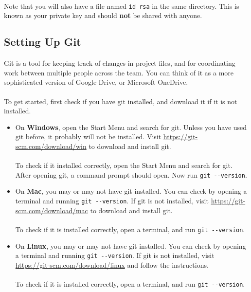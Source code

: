 \documentclass[11pt]{article}
\begin{document}
\paragraph{}
Note that you will also have a file named \lstinline{id_rsa} in the same directory. This is known as your private key and should \textbf{not} be shared with anyone.
\subsection{Setting Up Git}
\paragraph{}
Git is a tool for keeping track of changes in project files, and for coordinating work between multiple people across the team. You can think of it as a more sophisticated version of Google Drive, or Microsoft OneDrive.
\paragraph{}
To get started, first check if you have git installed, and download it if it is not installed.
\begin{itemize}
\item On \textbf{Windows}, open the Start Menu and search for git. Unless you have used git before, it probably will not be installed. Visit \url{https://git-scm.com/download/win} to download and install git.\\\\
To check if it installed correctly, open the Start Menu and search for git. After opening git, a command prompt should open. Now run \lstinline{git --version}.
\item On \textbf{Mac}, you may or may not have git installed. You can check by opening a terminal and running \lstinline{git --version}. If git is not installed, visit \url{https://git-scm.com/download/mac} to download and install git.\\\\
To check if it is installed correctly, open a terminal, and run \lstinline{git --version}.
\item On \textbf{Linux}, you may or may not have git installed. You can check by opening a terminal and running \lstinline{git --version}. If git is not installed, visit \url{https://git-scm.com/download/linux} and follow the instructions.\\\\
To check if it is installed correctly, open a terminal, and run \lstinline{git --version}.
\end{itemize}
\end{document}
